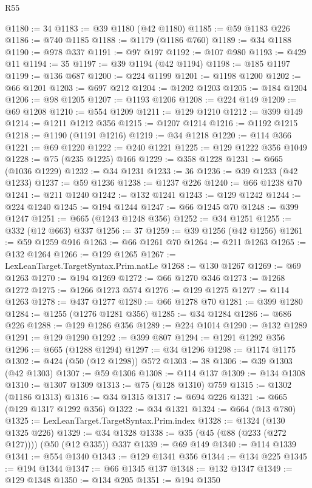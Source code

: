 \begin{lexlean}{R55}
\begin{coremodule}
{{{{{{{{{{{{{{{{{{{{{{{{{{{{{{{{{{{{{{{{{{{{{{{{{{{{{{{{{{{{{{{{{{{{{{{{{{{{{{{{@1180 := 34
@1183 := @39 @1180 (@42 @1180)
@1185 := @59 @1183 @226
@1186 := @740 @1185
@1188 := @1179 (@1186 @760)
@1189 := @34 @1188
@1190 := @978 @337
@1191 := @97 @197
@1192 := @107 @980
@1193 := @429 @11
@1194 := 35
@1197 := @39 @1194 (@42 @1194)
@1198 := @185 @1197
@1199 := @136 @687
@1200 := @224 @1199
@1201 := @1198 @1200
@1202 := @66 @1201
@1203 := @697 @212
@1204 := @1202 @1203
@1205 := @184 @1204
@1206 := @98 @1205
@1207 := @1193 @1206
@1208 := @224 @149
@1209 := @69 @1208
@1210 := @554 @1209
@1211 := @129 @1210
@1212 := @399 @149
@1214 := @1211 @1212 @356
@1215 := @1207 @1214
@1216 := @1192 @1215
@1218 := @1190 (@1191 @1216)
@1219 := @34 @1218
@1220 := @114 @366
@1221 := @69 @1220
@1222 := @240 @1221
@1225 := @129 @1222 @356 @1049
@1228 := @75 (@235 @1225) @166
@1229 := @358 @1228
@1231 := @665 (@1036 @1229)
@1232 := @34 @1231
@1233 := 36
@1236 := @39 @1233 (@42 @1233)
@1237 := @59 @1236
@1238 := @1237 @226
@1240 := @66 @1238 @70
@1241 := @211 @1240
@1242 := @132 @1241
@1243 := @129 @1242
@1244 := @224 @1240
@1245 := @194 @1244
@1247 := @66 @1245 @70
@1248 := @399 @1247
@1251 := @665 (@1243 @1248 @356)
@1252 := @34 @1251
@1255 := @332 (@12 @663) @337
@1256 := 37
@1259 := @39 @1256 (@42 @1256)
@1261 := @59 @1259 @916
@1263 := @66 @1261 @70
@1264 := @211 @1263
@1265 := @132 @1264
@1266 := @129 @1265
@1267 := LexLeanTarget.TargetSyntax.Prim.natLe
@1268 := @130 @1267
@1269 := @69 @1263
@1270 := @194 @1269
@1272 := @66 @1270 @346
@1273 := @1268 @1272
@1275 := @1266 @1273 @574
@1276 := @129 @1275
@1277 := @114 @1263
@1278 := @437 @1277
@1280 := @66 @1278 @70
@1281 := @399 @1280
@1284 := @1255 (@1276 @1281 @356)
@1285 := @34 @1284
@1286 := @686 @226
@1288 := @129 @1286 @356
@1289 := @224 @1014
@1290 := @132 @1289
@1291 := @129 @1290
@1292 := @399 @807
@1294 := @1291 @1292 @356
@1296 := @665 (@1288 @1294)
@1297 := @34 @1296
@1298 := @1174 @1175
@1302 := @424 (@50 (@12 @1298)) @572
@1303 := 38
@1306 := @39 @1303 (@42 @1303)
@1307 := @59 @1306
@1308 := @114 @137
@1309 := @134 @1308
@1310 := @1307 @1309
@1313 := @75 (@128 @1310) @759
@1315 := @1302 (@1186 @1313)
@1316 := @34 @1315
@1317 := @694 @226
@1321 := @665 (@129 @1317 @1292 @356)
@1322 := @34 @1321
@1324 := @664 (@13 @780)
@1325 := LexLeanTarget.TargetSyntax.Prim.index
@1328 := @1324 (@130 @1325 @226)
@1329 := @34 @1328
@1338 := @35 (@45 (@88 (@233 (@272 @127)))) (@50 (@12 @335)) @337
@1339 := @69 @149
@1340 := @114 @1339
@1341 := @554 @1340
@1343 := @129 @1341 @356
@1344 := @134 @225
@1345 := @194 @1344
@1347 := @66 @1345 @137
@1348 := @132 @1347
@1349 := @129 @1348
@1350 := @134 @205
@1351 := @194 @1350
}}}}}}}}}}}}}}}}}}}}}}}}}}}}}}}}}}}}}}}}}}}}}}}}}}}}}}}}}}}}}}}}}}}}}}}}}}}}}}}}
\end{coremodule}
\end{lexlean}
